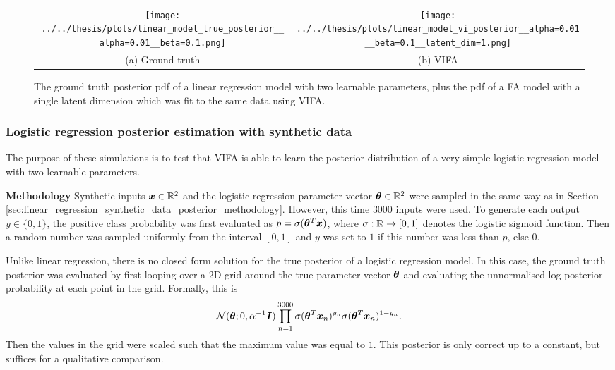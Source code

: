 \documentclass[10pt]{article} %
\begin{document}
\begin{figure}[!htbp] 
\begin{center}
\begin{tabular}{cc}
	\texttt{[image: ../../thesis/plots/linear\_model\_true\_posterior\_\_alpha=0.01\_\_beta=0.1.png]}
	& \texttt{[image: ../../thesis/plots/linear\_model\_vi\_posterior\_\_alpha=0.01\_\_beta=0.1\_\_latent\_dim=1.png]} \\
	(a) Ground truth
	& (b) VIFA \\[6pt]
\end{tabular}
\end{center}
\caption{The ground truth posterior pdf of a linear regression model with two learnable parameters, plus the pdf of a FA model with a single latent dimension which was fit to the same data using VIFA.}
\label{fig:linear_regression_synthetic_data_posterior}
\end{figure}


\subsubsection{Logistic regression posterior estimation with synthetic data}

The purpose of these simulations is to test that VIFA is able to learn the posterior distribution of a very simple logistic regression model with two learnable parameters.

\textbf{Methodology} Synthetic inputs ${\bm{x}} \in \mathbb{R}^2$ and the logistic regression parameter vector ${\bm{\theta}} \in \mathbb{R}^2$ were sampled in the same way as in Section \ref{sec:linear_regression_synthetic_data_posterior_methodology}. However, this time $3000$ inputs were used. To generate each output $y \in \{0, 1\}$, the positive class probability was first evaluated as $p = \sigma({\bm{\theta}}^T {\bm{x}})$, where $\sigma: \mathbb{R} \rightarrow [0,1]$ denotes the logistic sigmoid function. Then a random number was sampled uniformly from the interval $[0, 1]$ and $y$ was set to $1$ if this number was less than $p$, else $0$.

Unlike linear regression, there is no closed form solution for the true posterior of a logistic regression model. In this case, the ground truth posterior was evaluated by first looping over a 2D grid around the true parameter vector ${\bm{\theta}}$ and evaluating the unnormalised log posterior probability at each point in the grid. Formally, this is
\begin{equation}
	\mathcal{N} ( {\bm{\theta}} ; 0, \alpha^{-1} {\bm{I}}) \prod_{n=1}^{3000} \sigma({\bm{\theta}}^T {\bm{x}}_n)^{y_n} \sigma({\bm{\theta}}^T {\bm{x}}_n)^{1 - y_n}.
\end{equation}
Then the values in the grid were scaled such that the maximum value was equal to $1$. This posterior is only correct up to a constant, but suffices for a qualitative comparison.
\end{document}

